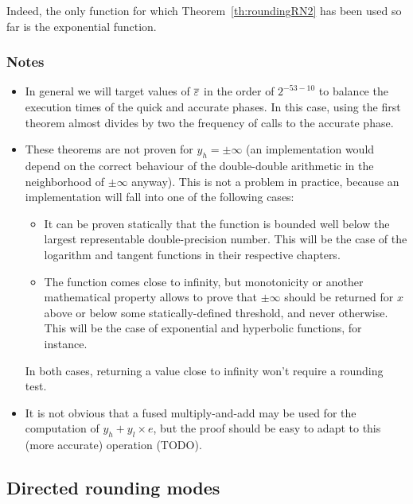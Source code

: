 Indeed, the only function for which Theorem~\ref{th:roundingRN2} has
been used so far is the exponential function.



\subsubsection*{Notes}

\begin{itemize}
\item In general we will target values of ${\overline{\varepsilon}}$ in the order of
  $2^{-53-10}$ to balance the execution times of the quick and
  accurate phases. In this case, using the first theorem almost divides
  by two the frequency of calls to the accurate phase. 

\item These theorems are not proven for $y_h = \pm \infty$ (an
  implementation would depend on the correct behaviour of the
  double-double arithmetic in the neighborhood of $\pm \infty$
  anyway).  This is not a problem in practice, because an
  implementation will fall into one of the following cases:
\begin{itemize}
\item It can be proven statically that the function is bounded well
  below the largest representable double-precision number. This will
  be the case of the logarithm and tangent functions in their
  respective chapters.
\item The function comes close to infinity, but monotonicity or
  another mathematical property allows to prove that $\pm \infty$
  should be returned for $x$ above or below some statically-defined
  threshold, and never otherwise. This will be the case of exponential
  and hyperbolic functions, for instance.
\end{itemize}
In both cases, returning a value close to infinity won't require a
rounding test.


\item It is not obvious that a fused multiply-and-add may be used for
  the computation of $y_h+y_l\times e$, but the proof should be easy
  to adapt to this (more accurate) operation (TODO).


\end{itemize}



\subsection{Directed rounding modes}

